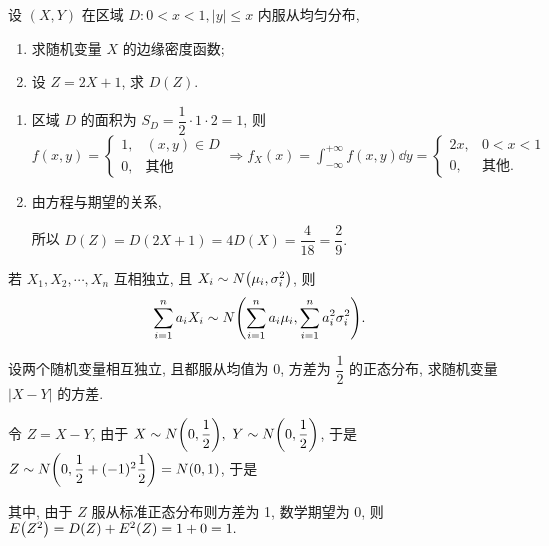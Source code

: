 \begin{example}
    设 $(X,Y)$ 在区域 $D:0<x<1,|y|\leqslant x$ 内服从均匀分布, 
    \begin{enumerate}[label=(\arabic{*})]
        \item 求随机变量 $X$ 的边缘密度函数;
        \item 设 $Z=2X+1$, 求 $D(Z)$.
    \end{enumerate}
\end{example}
\begin{solution}
    \begin{enumerate}[label=(\arabic{*})]
        \item 区域 $D$ 的面积为 $S_D=\dfrac{1}{2}\cdot1\cdot2=1$, 则 $f(x,y)=\begin{cases}
                      1, & (x,y)\in D  \\
                      0, & \text{其他}
                  \end{cases}\Rightarrow f_X(x)=\displaystyle\int_{-\infty}^{+\infty}f(x,y)\dd y=\begin{cases}
                      2x, & 0<x<1        \\
                      0,  & \text{其他}.
                  \end{cases}$
        \item 由方程与期望的关系, 
              所以 $D(Z)=D(2X+1)=4D(X)=\dfrac{4}{18}=\dfrac{2}{9}.$
    \end{enumerate}
\end{solution}

\begin{theorem}
    若 $X_1,X_2,\cdots,X_n$ 互相独立, 且 $X_i\sim N\qty(\mu_i,\sigma_i^2)$, 则
    $$\sum_{i=1}^{n}a_iX_i\sim N\qty(\sum_{i=1}^{n}a_i\mu_i,\sum_{i=1}^{n}a_i^2\sigma_i^2).$$
\end{theorem}

\begin{example}[1998 数一]
    设两个随机变量相互独立, 且都服从均值为 0, 方差为 $\dfrac{1}{2}$ 的正态分布, 求随机变量 $|X-Y|$ 的方差.
\end{example}
\begin{solution}
    令 $Z=X-Y$, 由于 $X\sim N\qty(0,\dfrac{1}{2}),~Y\sim N\qty(0,\dfrac{1}{2})$, 于是
    $Z\sim N\qty(0,\dfrac{1}{2}+(-1)^2\dfrac{1}{2})=N\qty(0,1)$, 于是
    其中, 由于 $Z$ 服从标准正态分布则方差为 1, 数学期望为 0, 则 $E\qty(Z^2)=D(Z)+E^2(Z)=1+0=1.$
\end{solution}

